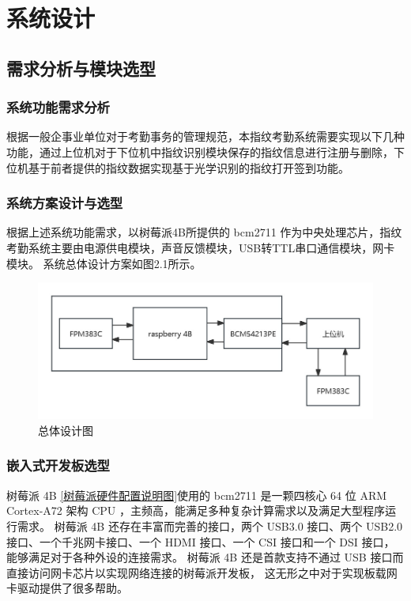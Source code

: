 \section{系统设计}

\subsection{需求分析与模块选型}

\subsubsection{系统功能需求分析}

根据一般企事业单位对于考勤事务的管理规范，本指纹考勤系统需要实现以下几种功能，通过上位机对于下位机中指纹识别模块保存的指纹信息进行注册与删除，下位机基于前者提供的指纹数据实现基于光学识别的指纹打开签到功能。

\subsubsection{系统方案设计与选型}

根据上述系统功能需求，以树莓派4B所提供的 bcm2711 作为中央处理芯片，指纹考勤系统主要由电源供电模块，声音反馈模块，USB转TTL串口通信模块，网卡模块。
系统总体设计方案如图2.1所示。

\begin{figure}[ht]
    \centering
    \includegraphics[width=\textwidth]{imgs/总体设计图.png}
    \caption{总体设计图}    \label{overall_design}
\end{figure}

\subsubsection{嵌入式开发板选型}

树莓派 4B \ref{树莓派硬件配置说明图}使用的 bcm2711 是一颗四核心 64 位 ARM Cortex-A72 架构 CPU ，主频高，能满足多种复杂计算需求以及满足大型程序运行需求。
树莓派 4B 还存在丰富而完善的接口，两个 USB3.0 接口、两个 USB2.0 接口、一个千兆网卡接口、一个 HDMI 接口、一个 CSI 接口和一个 DSI 接口，能够满足对于各种外设的连接需求。
树莓派 4B 还是首款支持不通过 USB 接口而直接访问网卡芯片以实现网络连接的树莓派开发板，
这无形之中对于实现板载网卡驱动提供了很多帮助。

